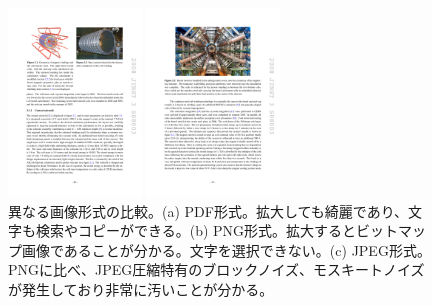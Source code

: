 \begin{figure}
    \begin{minipage}[b]{.5\linewidth}
    \centering
        \includegraphics[height=5cm]{fig/Intro/ATLASmagnet.pdf}
        \end{minipage}%
    \begin{minipage}[b]{.5\linewidth}
        \centering
        \includegraphics[height=5cm]{fig/Intro/ATLAStroido.pdf}
    \end{minipage}%
    \caption[異なる画像形式の比較]{異なる画像形式の比較。(a) PDF形式。拡大しても綺麗であり、文字も検索やコピーができる。(b) PNG形式。拡大するとビットマップ画像であることが分かる。文字を選択できない。(c) JPEG形式。PNGに比べ、JPEG圧縮特有のブロックノイズ、モスキートノイズが発生しており非常に汚いことが分かる。}
\end{figure}

